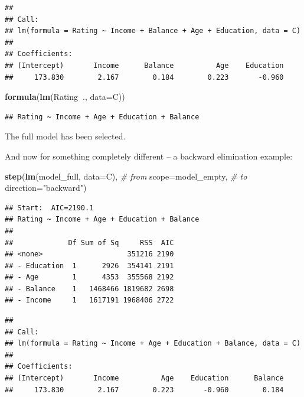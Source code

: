 \documentclass[10pt,b5paper,krantz1]{krantz}
\newenvironment{Shaded}{\begin{snugshade}}{\end{snugshade}}
\newcommand{\CommentTok}[1]{\textcolor[rgb]{0.37,0.37,0.37}{\textit{#1}}}
\newcommand{\DataTypeTok}[1]{\textcolor[rgb]{0.27,0.27,0.27}{#1}}
\newcommand{\KeywordTok}[1]{\textcolor[rgb]{0.27,0.27,0.27}{\textbf{#1}}}
\newcommand{\NormalTok}[1]{#1}
\newcommand{\OperatorTok}[1]{\textcolor[rgb]{0.43,0.43,0.43}{\textbf{#1}}}
\newcommand{\StringTok}[1]{\textcolor[rgb]{0.5,0.5,0.5}{#1}}
\begin{document}
\begin{verbatim}
## 
## Call:
## lm(formula = Rating ~ Income + Balance + Age + Education, data = C)
## 
## Coefficients:
## (Intercept)       Income      Balance          Age    Education  
##     173.830        2.167        0.184        0.223       -0.960
\end{verbatim}

\begin{Shaded}
\begin{Highlighting}[]
\KeywordTok{formula}\NormalTok{(}\KeywordTok{lm}\NormalTok{(Rating}\OperatorTok{~}\NormalTok{., }\DataTypeTok{data=}\NormalTok{C))}
\end{Highlighting}
\end{Shaded}

\begin{verbatim}
## Rating ~ Income + Age + Education + Balance
\end{verbatim}

The full model has been selected.

\bigskip

And now for something completely different --
a backward elimination example:

\begin{Shaded}
\begin{Highlighting}[]
\KeywordTok{step}\NormalTok{(}\KeywordTok{lm}\NormalTok{(model_full, }\DataTypeTok{data=}\NormalTok{C), }\CommentTok{# from}
     \DataTypeTok{scope=}\NormalTok{model_empty,      }\CommentTok{# to}
     \DataTypeTok{direction=}\StringTok{"backward"}\NormalTok{)}
\end{Highlighting}
\end{Shaded}

\begin{verbatim}
## Start:  AIC=2190.1
## Rating ~ Income + Age + Education + Balance
## 
##             Df Sum of Sq     RSS  AIC
## <none>                    351216 2190
## - Education  1      2926  354141 2191
## - Age        1      4353  355568 2192
## - Balance    1   1468466 1819682 2698
## - Income     1   1617191 1968406 2722
\end{verbatim}

\begin{verbatim}
## 
## Call:
## lm(formula = Rating ~ Income + Age + Education + Balance, data = C)
## 
## Coefficients:
## (Intercept)       Income          Age    Education      Balance  
##     173.830        2.167        0.223       -0.960        0.184
\end{verbatim}
\end{document}
